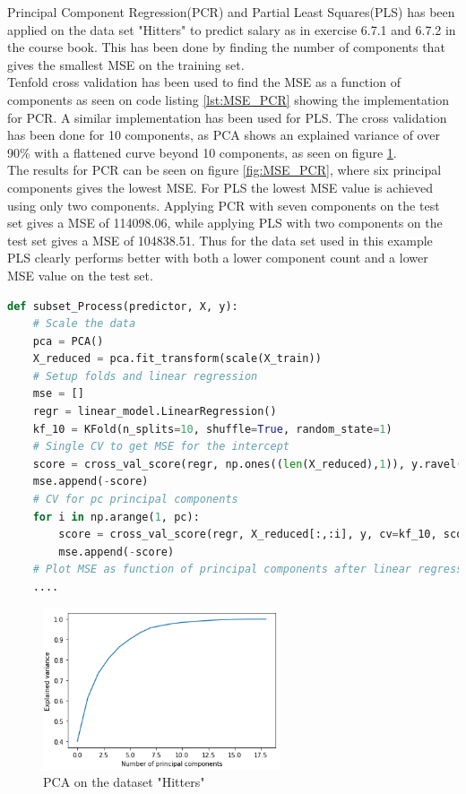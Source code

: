Principal Component Regression(PCR) and Partial Least Squares(PLS) has been applied on the data set "Hitters" to predict salary as in exercise 6.7.1 and 6.7.2 in the course book. This has been done by finding the number of components that gives the smallest MSE on the training set.\\
Tenfold cross validation has been used to find the MSE as a function of components as seen on code listing \ref{lst:MSE_PCR} showing the implementation for PCR. A similar implementation has been used for PLS. The cross validation has been done for 10 components, as PCA shows an explained variance of over 90\% with a flattened curve beyond 10 components, as seen on figure \ref{fig:PCA_hitters_dataset}.\\
The results for PCR can be seen on figure \ref{fig:MSE_PCR}, where six principal components gives the lowest MSE. For PLS the lowest MSE value is achieved using only two components.
Applying PCR with seven components on the test set gives a MSE of 114098.06, while applying PLS with two components on the test set gives a MSE of 104838.51. Thus for the data set used in this example PLS clearly performs better with both a lower component count and a lower MSE value on the test set.

\begin{lstlisting}[language=Python, caption=Code snippet showing tenfold cross validation of PCR]
def subset_Process(predictor, X, y):	
	# Scale the data
	pca = PCA()
	X_reduced = pca.fit_transform(scale(X_train))	
	# Setup folds and linear regression
	mse = []
	regr = linear_model.LinearRegression()
	kf_10 = KFold(n_splits=10, shuffle=True, random_state=1)
	# Single CV to get MSE for the intercept
	score = cross_val_score(regr, np.ones((len(X_reduced),1)), y.ravel(), cv=kf_10, scoring='neg_mean_squared_error').mean()    
	mse.append(-score)
	# CV for pc principal components
	for i in np.arange(1, pc):
		score = cross_val_score(regr, X_reduced[:,:i], y, cv=kf_10, scoring='neg_mean_squared_error').mean()
		mse.append(-score)
	# Plot MSE as function of principal components after linear regression
	....
\end{lstlisting}\label{lst:MSE_PCR}

\begin{figure}[H]
	\centering
	\includegraphics[width=7cm]{Img/PCA_hitters_dataset.PNG}
	\caption{PCA on the dataset "Hitters"}
	\label{fig:PCA_hitters_dataset}
\end{figure} 

